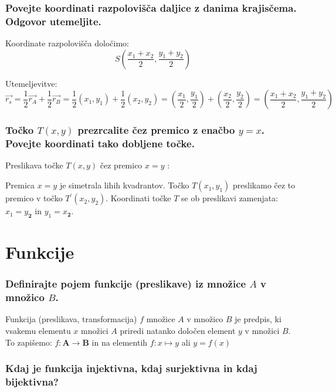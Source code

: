 \documentclass{article}
\begin{document}
\subsubsection*{Povejte koordinati razpolovišča daljice z danima krajisčema. Odgovor utemeljite.}

Koordinate razpolovišča določimo:
$$
    S \left(\frac{x_1 + x_2}{2}, \frac{y_1 + y_2}{2} \right)
$$

Utemeljevitve:
$$
\vec{r_s} = \frac{1}{2}\vec{r_A} + \frac{1}{2}\vec{r_B} = \frac{1}{2}(x_1, y_1) + \frac{1}{2}(x_2, y_2) = \left(\frac{x_1}{2}, \frac{y_1}{2}\right) + \left(\frac{x_2}{2}, \frac{y_2}{2}\right) = \left(\frac{x_1 + x_2}{2}, \frac{y_1 + y_2}{2}\right)
$$
\subsubsection*{Točko $T(x, y)$ prezrcalite čez premico z enačbo $y=x$. Povejte koordinati tako dobljene točke.}

Preslikava točke $T(x, y)$ čez premico $x=y$ :

Premica $x=y$ je simetrala lihih kvadrantov. Točko $T\left(x_{1}, y_{1}\right)$ preslikamo čez to premico v točko $T^{\prime}\left(x_{2}, y_{2}\right)$. Koordinati točke $T$ se ob preslikavi zamenjata: $x_{1}=y_{\mathbf{2}}$ in $y_{1}=x_{\mathbf{2}}$.

\section{Funkcije}
\subsubsection*{Definirajte pojem funkcije (preslikave) iz množice $A$ v množico $B$.}

Funkcija (preslikava, transformacija) $f$ množice $A$ v množico $B$ je predpis, ki vsakemu elementu $x$ množici $A$ priredi natanko določen element $y$ v množici $B$. To zapišemo: $f: \boldsymbol{A} \rightarrow \boldsymbol{B}$ in na elementih $f: x \mapsto y$ ali $y=f(x)$

\subsubsection*{Kdaj je funkcija injektivna, kdaj surjektivna in kdaj bijektivna?}
\end{document}
